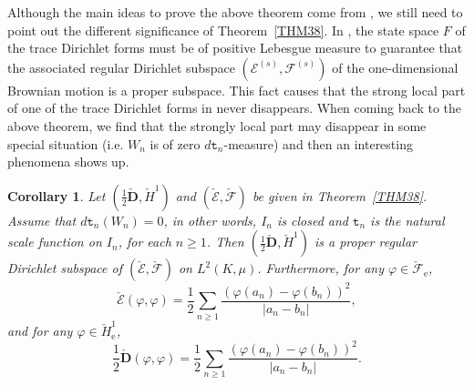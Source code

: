 \documentclass[a4paper]{amsart}
\newtheorem{corollary}[theorem]{Corollary}
\theoremstyle{definition}
\theoremstyle{remark}
\numberwithin{equation}{section}
\begin{document}
{Although the main ideas to prove the above theorem come from \cite[Theorem~2.1]{LY14}, we still need to point out the different significance of Theorem~\ref{THM38}. In \cite[Theorem~2.1]{LY14}, the state space $F$ of the trace Dirichlet forms must be of positive Lebesgue measure to guarantee that the associated regular Dirichlet subspace $({{\mathcal{E}}}^{(s)},{{\mathcal{F}}}^{(s)})$ of the one-dimensional Brownian motion is a proper subspace. This fact causes that the strong local part of one of the trace Dirichlet forms in \cite[Theorem~2.1]{LY14} never disappears. When coming back to the above theorem, we find that the strongly local part may disappear in some special situation (i.e. $W_n$ is of zero $d{{\mathtt{t}}}_n$-measure) and then an interesting phenomena shows up. }

\begin{corollary}\label{COR39}
Let $(\frac{1}{2}\check{\mathbf{D}}, \check{H}^1)$ and $(\check{{\mathcal{E}}},\check{{\mathcal{F}}})$ be given in Theorem~\ref{THM38}. Assume that $d{{\mathtt{t}}}_n(W_n)=0$, in other words, $I_n$ is closed and ${{\mathtt{t}}}_n$ is the natural scale function on $I_n$, for each $n\geq 1$. Then $(\frac{1}{2}\check{\mathbf{D}}, \check{H}^1)$ is a proper regular Dirichlet subspace of $(\check{{\mathcal{E}}},\check{{\mathcal{F}}})$ on $L^2(K,\mu)$. Furthermore, for any $\varphi\in \check{{\mathcal{F}}}_\mathrm{e}$,
\begin{equation}\label{EQ3EVVS}
\check{{\mathcal{E}}}(\varphi, \varphi)=\frac{1}{2}\sum_{n\geq 1}\frac{(\varphi(a_n)-\varphi(b_n))^2}{|a_n-b_n|},
\end{equation}	
and for any $\varphi\in \check{H}^1_\mathrm{e}$,
\begin{equation}\label{EQ3DVVS}
\frac{1}{2}\check{\mathbf{D}}(\varphi, \varphi)=\frac{1}{2}\sum_{n\geq 1}\frac{(\varphi(a_n)-\varphi(b_n))^2}{|a_n-b_n|}.
\end{equation}
\end{corollary}
\end{document}
